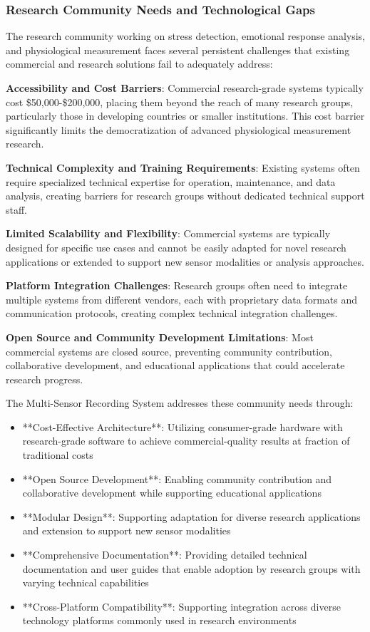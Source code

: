 \documentclass[12pt,a4paper]{article}
\begin{document}
\subsubsection{Research Community Needs and Technological Gaps}

The research community working on stress detection, emotional response analysis, and physiological measurement faces
several persistent challenges that existing commercial and research solutions fail to adequately address:

\textbf{Accessibility and Cost Barriers}: Commercial research-grade systems typically cost \$50,000-\$200,000, placing them
beyond the reach of many research groups, particularly those in developing countries or smaller institutions. This cost
barrier significantly limits the democratization of advanced physiological measurement research.

\textbf{Technical Complexity and Training Requirements}: Existing systems often require specialized technical expertise for
operation, maintenance, and data analysis, creating barriers for research groups without dedicated technical support
staff.

\textbf{Limited Scalability and Flexibility}: Commercial systems are typically designed for specific use cases and cannot be
easily adapted for novel research applications or extended to support new sensor modalities or analysis approaches.

\textbf{Platform Integration Challenges}: Research groups often need to integrate multiple systems from different vendors,
each with proprietary data formats and communication protocols, creating complex technical integration challenges.

\textbf{Open Source and Community Development Limitations}: Most commercial systems are closed source, preventing community
contribution, collaborative development, and educational applications that could accelerate research progress.

The Multi-Sensor Recording System addresses these community needs through:

\begin{itemize}
\item **Cost-Effective Architecture**: Utilizing consumer-grade hardware with research-grade software to achieve
  commercial-quality results at fraction of traditional costs
\item **Open Source Development**: Enabling community contribution and collaborative development while supporting
  educational applications
\item **Modular Design**: Supporting adaptation for diverse research applications and extension to support new sensor
  modalities
\item **Comprehensive Documentation**: Providing detailed technical documentation and user guides that enable adoption by
  research groups with varying technical capabilities
\item **Cross-Platform Compatibility**: Supporting integration across diverse technology platforms commonly used in research
  environments

\end{itemize}
\end{document}
